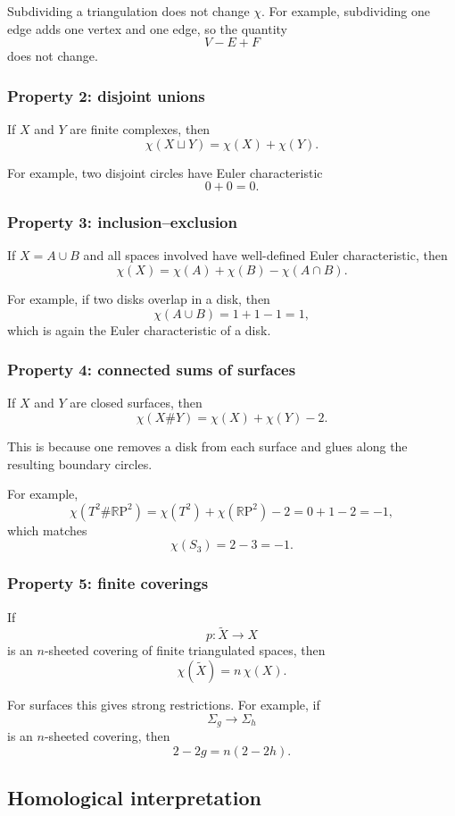 \documentclass[12pt,a4paper]{article}
\newcommand{\RP}{\mathbb{R}\mathrm{P}}
\theoremstyle{notespace}
\begin{document}
Subdividing a triangulation does not change \(\chi\). For example, subdividing one edge adds one vertex and one edge, so the quantity
\[
V-E+F
\]
does not change.

\subsubsection*{Property 2: disjoint unions}

If \(X\) and \(Y\) are finite complexes, then
\[
\chi(X\sqcup Y)=\chi(X)+\chi(Y).
\]

For example, two disjoint circles have Euler characteristic
\[
0+0=0.
\]

\subsubsection*{Property 3: inclusion--exclusion}

If \(X=A\cup B\) and all spaces involved have well-defined Euler characteristic, then
\[
\chi(X)=\chi(A)+\chi(B)-\chi(A\cap B).
\]

For example, if two disks overlap in a disk, then
\[
\chi(A\cup B)=1+1-1=1,
\]
which is again the Euler characteristic of a disk.

\subsubsection*{Property 4: connected sums of surfaces}

If \(X\) and \(Y\) are closed surfaces, then
\[
\chi(X\#Y)=\chi(X)+\chi(Y)-2.
\]

This is because one removes a disk from each surface and glues along the resulting boundary circles.

For example,
\[
\chi(T^2\#\RP^2)=\chi(T^2)+\chi(\RP^2)-2=0+1-2=-1,
\]
which matches
\[
\chi(S_3)=2-3=-1.
\]

\subsubsection*{Property 5: finite coverings}

If
\[
p:\widetilde X\to X
\]
is an \(n\)-sheeted covering of finite triangulated spaces, then
\[
\chi(\widetilde X)=n\,\chi(X).
\]

For surfaces this gives strong restrictions. For example, if
\[
\Sigma_g\to \Sigma_h
\]
is an \(n\)-sheeted covering, then
\[
2-2g=n(2-2h).
\]

\subsection{Homological interpretation}
\end{document}
